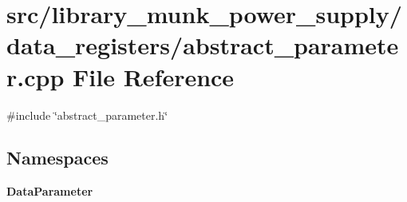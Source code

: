 \section{src/library\+\_\+munk\+\_\+power\+\_\+supply/data\+\_\+registers/abstract\+\_\+parameter.cpp File Reference}
\label{abstract__parameter_8cpp}
{\ttfamily \#include \char`\"{}abstract\+\_\+parameter.\+h\char`\"{}}\newline
\subsection*{Namespaces}
\begin{DoxyCompactItemize}
\item 
 \textbf{ Data\+Parameter}
\end{DoxyCompactItemize}
